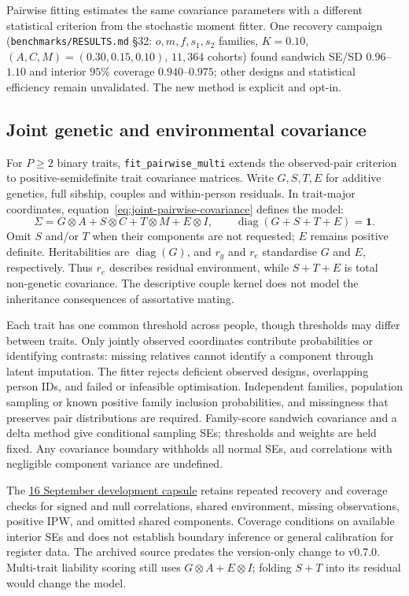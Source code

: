 Pairwise fitting estimates the same covariance parameters with a different
statistical criterion from the stochastic moment fitter. One recovery campaign
(\texttt{benchmarks/RESULTS.md} \S32: $o,m,f,s_1,s_2$ families, $K=0.10$,
$(A,C,M)=(0.30,0.15,0.10)$, $11{,}364$ cohorts) found sandwich SE/SD
$0.96$--$1.10$ and interior $95\%$ coverage $0.940$--$0.975$; other designs
and statistical efficiency remain unvalidated. The new method is explicit and opt-in.

\subsection{Joint genetic and environmental covariance}
\label{sec:joint-pairwise}

For $P\ge2$ binary traits, \texttt{fit\_pairwise\_multi} extends the observed-pair
criterion to positive-semidefinite trait covariance matrices. Write $G,S,T,E$
for additive genetics, full sibship, couples and within-person residuals.
In trait-major coordinates, equation~\eqref{eq:joint-pairwise-covariance} defines
the model:
\begin{equation}
 \Sigma=G\otimes A+S\otimes C+T\otimes M+E\otimes I,
 \qquad \operatorname{diag}(G+S+T+E)=\bm{1}.
 \label{eq:joint-pairwise-covariance}
\end{equation}
Omit $S$ and/or $T$ when their components are not requested; $E$ remains
positive definite. Heritabilities are $\operatorname{diag}(G)$, and $r_g$ and
$r_e$ standardise $G$ and $E$, respectively. Thus $r_e$ describes residual
environment, while $S+T+E$ is total non-genetic covariance. The descriptive
couple kernel does not model the inheritance consequences of assortative mating.

Each trait has one common threshold across people, though thresholds may differ
between traits. Only jointly observed coordinates contribute probabilities or
identifying contrasts: missing relatives cannot identify a component through
latent imputation. The fitter rejects deficient observed designs, overlapping
person IDs, and failed or infeasible optimisation. Independent families,
population sampling or known positive family inclusion probabilities, and
missingness that preserves pair distributions are required. Family-score
sandwich covariance and a delta method give conditional sampling SEs; thresholds
and weights are held fixed. Any covariance boundary withholds all normal SEs,
and correlations with negligible component variance are undefined.

The \href{https://github.com/bvilhjal/ltpred/tree/main/benchmarks/results/2026-09-16-joint-pairwise}{16 September development capsule}
retains repeated recovery and coverage checks for signed and null correlations,
shared environment, missing observations, positive IPW, and omitted shared
components. Coverage conditions on available interior SEs and does not establish
boundary inference or general calibration for register data. The archived
source predates the version-only change to v0.7.0. Multi-trait liability scoring
still uses $G\otimes A+E\otimes I$; folding $S+T$ into its residual would change
the model.

